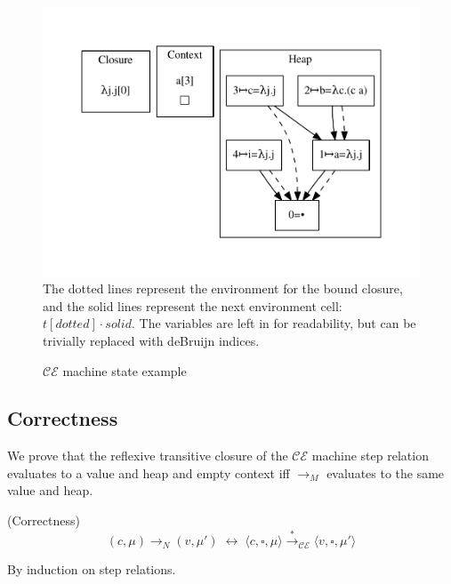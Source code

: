 \begin{figure}
\includegraphics[width=\linewidth]{figures/18.pdf}
The dotted lines represent the environment for the bound closure, and the solid
lines represent the next environment cell:  $t[dotted] \cdot solid$. The
variables are left in for readability, but can be trivially replaced with
deBruijn indices. 

\caption{$\mathcal{CE}$ machine state example}
\label{fig:state}
\end{figure}

\subsection{Correctness}
We prove that the reflexive transitive closure of the $\mathcal{CE}$ machine
step relation evaluates to a value and heap and empty context iff
$\xrightarrow{}_{M}$ evaluates to the same value and heap.

{\theorem \textnormal{(Correctness)} $$(c, \mu) \rightarrow_{N} (v, \mu') \;
\leftrightarrow \; \langle c, \square, \mu \rangle \xrightarrow{*
}_{\mathcal{CE}} \langle v, \square, \mu' \rangle $$} 

By induction on step relations.

